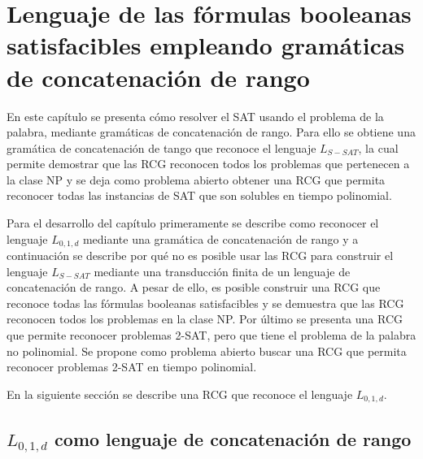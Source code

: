



\chapter{Lenguaje de las fórmulas booleanas satisfacibles empleando gramáticas de concatenación de rango}
\label{chap:LSATRCG}

En este capítulo se presenta cómo resolver el SAT usando el problema de la palabra, mediante gramáticas de 
concatenación de rango. Para ello se obtiene una gramática de concatenación de tango que reconoce el lenguaje $L_{S-SAT}$, la cual permite demostrar que las RCG reconocen todos los problemas que pertenecen a la clase NP y se deja como problema abierto obtener una RCG que permita reconocer todas las instancias de SAT que son solubles en tiempo polinomial.

Para el desarrollo del capítulo primeramente se describe como reconocer el lenguaje $L_{0,1,d}$ mediante una gramática de concatenación de rango y a continuación se describe por qué no es posible usar las RCG para construir el lenguaje $L_{S-SAT}$ mediante una transducción finita de un lenguaje de concatenación de rango. A pesar de ello, es posible construir una RCG que reconoce todas las fórmulas booleanas satisfacibles y se demuestra que las RCG reconocen todos los problemas en la clase NP. Por último se presenta una RCG que permite reconocer problemas 2-SAT, pero que tiene el problema de la palabra no polinomial. Se propone como problema abierto buscar una RCG que permita reconocer problemas 2-SAT en tiempo polinomial.

En la siguiente sección se describe una RCG que reconoce el lenguaje $L_{0,1,d}$.

\section{$L_{0,1,d}$ como lenguaje de concatenación de rango}

